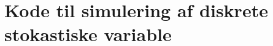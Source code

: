 \chapter{Kode til simulering af diskrete stokastiske variable} \label{app:kodeTilSimuleringAfDiskreteVariable}


